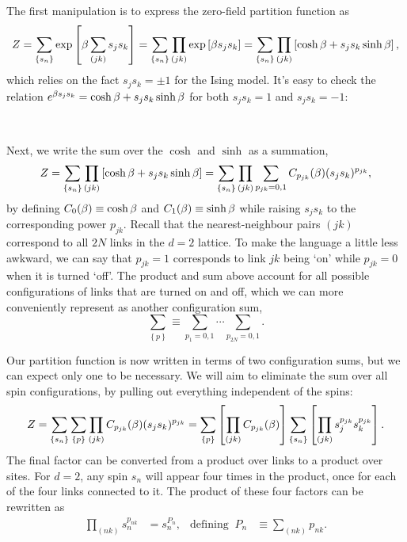 The first manipulation is to express the zero-field partition function as
\begin{equation*}
  Z = \sum_{\left\{s_n\right\}} \exp\left[\beta\sum_{(jk)} s_j s_k\right] = \sum_{\left\{s_n\right\}} \prod_{(jk)} \exp\left[\beta s_j s_k\right] = \sum_{\left\{s_n\right\}} \prod_{(jk)} \left[\cosh \beta + s_j s_k \sinh \beta\right],
\end{equation*}
which relies on the fact $s_j s_k = \pm 1$ for the Ising model.
It's easy to check the relation $e^{\beta s_j s_k} = \cosh \beta + s_j s_k \sinh \beta$ for both $s_j s_k = 1$ and $s_j s_k = -1$:
\begin{mdframed}
  \ \\[80 pt]
\end{mdframed}
Next, we write the sum over the $\cosh$ and $\sinh$ as a summation,
\begin{equation*}
  Z = \sum_{\left\{s_n\right\}} \prod_{(jk)} \left[\cosh \beta + s_j s_k \sinh \beta\right] = \sum_{\left\{s_n\right\}} \prod_{(jk)} \sum_{p_{jk} = 0, 1} C_{p_{jk}}(\beta) (s_j s_k)^{p_{jk}},
\end{equation*}
by defining $C_0(\beta) \equiv \cosh \beta$ and $C_1(\beta) \equiv \sinh \beta$ while raising $s_j s_k$ to the corresponding power $p_{jk}$.
Recall that the nearest-neighbour pairs $(jk)$ correspond to all $2N$ links in the $d = 2$ lattice.
To make the language a little less awkward, we can say that $p_{jk} = 1$ corresponds to link $jk$ being `on' while $p_{jk} = 0$ when it is turned `off'.
The product and sum above account for all possible configurations of links that are turned on and off, which we can more conveniently represent as another configuration sum,
\begin{equation*}
  \sum_{\left\{p\right\}} \equiv \sum_{p_1 = 0, 1} \cdots \sum_{p_{2N} = 0, 1}.
\end{equation*}

Our partition function is now written in terms of two configuration sums, but we can expect only one to be necessary.
We will aim to eliminate the sum over all spin configurations, by pulling out everything independent of the spins:
\begin{equation*}
  Z = \sum_{\left\{s_n\right\}} \sum_{\left\{p\right\}} \prod_{(jk)} C_{p_{jk}}(\beta) (s_j s_k)^{p_{jk}} = \sum_{\left\{p\right\}} \left[\prod_{(jk)} C_{p_{jk}}(\beta)\right] \sum_{\left\{s_n\right\}} \left[\prod_{(jk)} s_j^{p_{jk}} s_k^{p_{jk}}\right].
\end{equation*}
The final factor can be converted from a product over links to a product over sites.
For $d = 2$, any spin $s_n$ will appear four times in the product, once for each of the four links connected to it.
The product of these four factors can be rewritten as
\begin{align*}
  \prod_{(nk)} s_n^{p_{nk}} & = s_n^{P_n}, &
  \mbox{defining } \ P_n & \equiv \sum_{(nk)} p_{nk}.
\end{align*}

